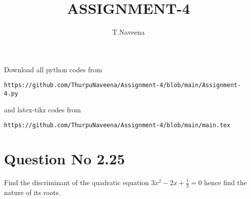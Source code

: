 \documentclass[journal,12pt,twocolumn]{IEEEtran}
\begin{document}
     \def\rightbox#1{\makebox[0in][r]{#1}}
     \def\centbox#1{\makebox[0in]{#1}}
     \def\topbox#1{\raisebox{-\baselineskip}[0in][0in]{#1}}
     \def\midbox#1{\raisebox{-0.5\baselineskip}[0in][0in]{#1}}
\vspace{3cm}
\title{ASSIGNMENT-4}
\author{T.Naveena}
\maketitle
\newpage
\bigskip
\renewcommand{\thefigure}{\theenumi}
\renewcommand{\thetable}{\theenumi}
%
Download all python codes from 
\begin{lstlisting}
https://github.com/ThurpuNaveena/Assignment-4/blob/main/Assignment-4.py
\end{lstlisting}
%
and latex-tikz codes from 
%
\begin{lstlisting}
https://github.com/ThurpuNaveena/Assignment-4/blob/main/main.tex
\end{lstlisting}
%
\section{Question No 2.25}
Find the discriminant of the quadratic equation $3x^2 -2x + \frac{1}{3} = 0$ hence find the nature of its roots.
%
\end{document}
